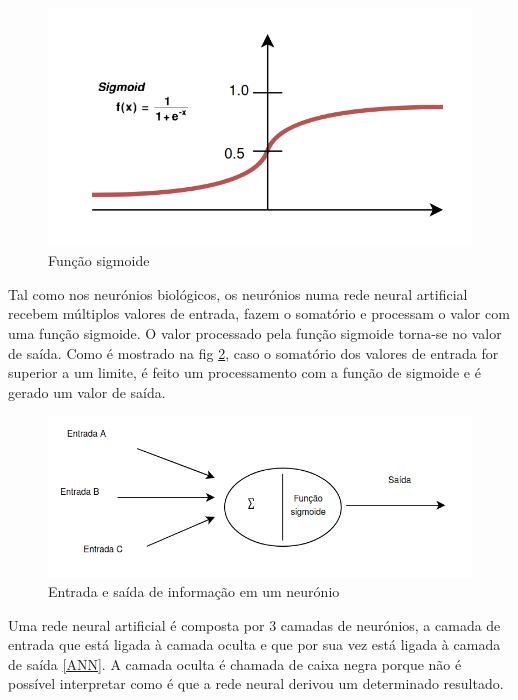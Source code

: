 \begin{figure}[H]
\centering
\includegraphics[scale=0.3]{figs/sigmoid}
\caption{Função sigmoide }\label{sigmoidF}
\end{figure}

Tal como nos neurónios biológicos, os neurónios numa rede neural artificial recebem múltiplos valores de entrada, fazem o somatório e processam o valor com uma função sigmoide. O valor processado pela função sigmoide torna-se no valor de saída. Como é mostrado na fig \ref{node1}, caso o somatório dos valores de entrada for superior a um limite, é feito um processamento com a função de sigmoide e é gerado um valor de saída.


\begin{figure}[H]
\centering
\includegraphics[scale=0.3]{figs/node1.png}
\caption{Entrada e saída de informação em um neurónio} \label{node1}
\end{figure}

Uma rede neural artificial é composta por 3 camadas de neurónios, a camada de entrada que está ligada à camada oculta e que por sua vez está ligada à camada de saída \ref{ANN}. A camada oculta é chamada de caixa negra porque não é possível interpretar como é que a rede neural derivou um determinado resultado.

